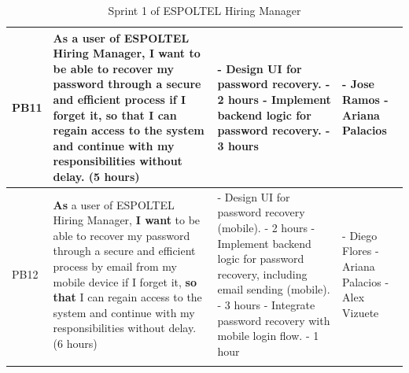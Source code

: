 \documentclass{scrreprt}
\begin{document}
\begin{longtable}{|p{1.5cm}|p{5.5cm}|p{4.5cm}|p{3cm}|}
PB11 & \textbf{As} a user of ESPOLTEL Hiring Manager, \textbf{I want} to be able to recover my password through a secure and efficient process if I forget it, \textbf{so that} I can regain access to the system and continue with my responsibilities without delay. (5 hours) & 
- Design UI for password recovery. - 2 hours \newline
- Implement backend logic for password recovery. - 3 hours
&
- Jose Ramos \newline
- Ariana Palacios
\\ \hline
PB12 & \textbf{As} a user of ESPOLTEL Hiring Manager, \textbf{I want} to be able to recover my password through a secure and efficient process by email from my mobile device if I forget it, \textbf{so that} I can regain access to the system and continue with my responsibilities without delay. (6 hours) &
- Design UI for password recovery (mobile). - 2 hours \newline
- Implement backend logic for password recovery, including email sending (mobile). - 3 hours\newline
- Integrate password recovery with mobile login flow. - 1 hour
&
- Diego Flores \newline
- Ariana Palacios \newline
- Alex Vizuete
\\ \hline

\caption{Sprint 1 of ESPOLTEL Hiring Manager}
\end{longtable}
\end{document}
